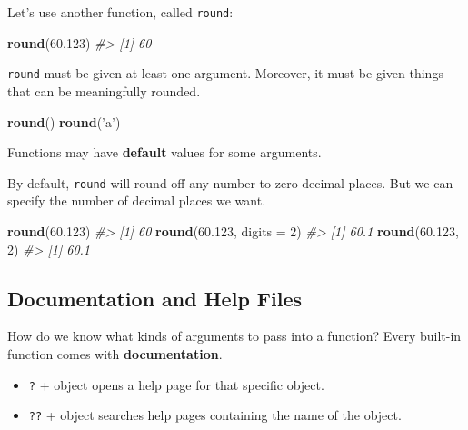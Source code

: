 \documentclass[]{book}
\newenvironment{Shaded}{\begin{snugshade}}{\end{snugshade}}
\newcommand{\KeywordTok}[1]{\textcolor[rgb]{0.13,0.29,0.53}{\textbf{#1}}}
\newcommand{\DataTypeTok}[1]{\textcolor[rgb]{0.13,0.29,0.53}{#1}}
\newcommand{\DecValTok}[1]{\textcolor[rgb]{0.00,0.00,0.81}{#1}}
\newcommand{\FloatTok}[1]{\textcolor[rgb]{0.00,0.00,0.81}{#1}}
\newcommand{\StringTok}[1]{\textcolor[rgb]{0.31,0.60,0.02}{#1}}
\newcommand{\CommentTok}[1]{\textcolor[rgb]{0.56,0.35,0.01}{\textit{#1}}}
\newcommand{\NormalTok}[1]{#1}
\providecommand{\tightlist}{%
  \setlength{\itemsep}{0pt}\setlength{\parskip}{0pt}}
\begin{document}
Let's use another function, called \texttt{round}:

\begin{Shaded}
\begin{Highlighting}[]
\KeywordTok{round}\NormalTok{(}\FloatTok{60.123}\NormalTok{)}
\CommentTok{#> [1] 60}
\end{Highlighting}
\end{Shaded}

\texttt{round} must be given at least one argument. Moreover, it must be
given things that can be meaningfully rounded.

\begin{Shaded}
\begin{Highlighting}[]
\KeywordTok{round}\NormalTok{()}
\KeywordTok{round}\NormalTok{(}\StringTok{'a'}\NormalTok{)}
\end{Highlighting}
\end{Shaded}

Functions may have \textbf{default} values for some arguments.

By default, \texttt{round} will round off any number to zero decimal
places. But we can specify the number of decimal places we want.

\begin{Shaded}
\begin{Highlighting}[]
\KeywordTok{round}\NormalTok{(}\FloatTok{60.123}\NormalTok{)}
\CommentTok{#> [1] 60}
\KeywordTok{round}\NormalTok{(}\FloatTok{60.123}\NormalTok{, }\DataTypeTok{digits =} \DecValTok{2}\NormalTok{)}
\CommentTok{#> [1] 60.1}
\KeywordTok{round}\NormalTok{(}\FloatTok{60.123}\NormalTok{, }\DecValTok{2}\NormalTok{)}
\CommentTok{#> [1] 60.1}
\end{Highlighting}
\end{Shaded}

\subsection{Documentation and Help
Files}\label{documentation-and-help-files}

How do we know what kinds of arguments to pass into a function? Every
built-in function comes with \textbf{documentation}.

\begin{itemize}
\tightlist
\item
  \texttt{?} + object opens a help page for that specific object.
\item
  \texttt{??} + object searches help pages containing the name of the
  object.
\end{itemize}
\end{document}
